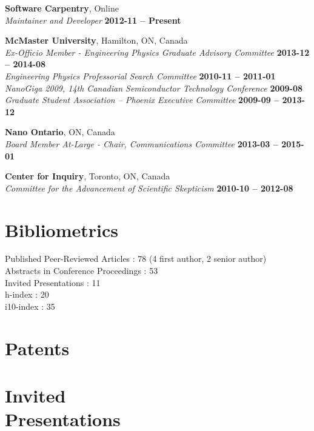 \documentclass[margin1,line,canadian]{resume}
\begin{document}
\begin{resume}
\textbf{Software Carpentry}, Online\\%
\textsl{Maintainer and Developer} \hfill \textbf{2012-11 -- Present}

\textbf{McMaster University}, Hamilton, ON, Canada\\%
\textsl{Ex-Officio Member - Engineering Physics Graduate Advisory Committee} \hfill \textbf{2013-12 -- 2014-08}\\
\textsl{Engineering Physics Professorial Search Committee} \hfill \textbf{2010-11 -- 2011-01}\\
\textsl{NanoGiga 2009, 14th Canadian Semiconductor Technology Conference} \hfill \textbf{2009-08}\\
\textsl{Graduate Student Association -- Phoenix Executive Committee} \hfill \textbf{2009-09 -- 2013-12}

\textbf{Nano Ontario}, ON, Canada\\%
\textsl{Board Member At-Large - Chair, Communications Committee} \hfill \textbf{2013-03 -- 2015-01}

\textbf{Center for Inquiry}, Toronto, ON, Canada\\%
\textsl{Committee for the Advancement of Scientific Skepticism} \hfill \textbf{2010-10 -- 2012-08}\\

\section{\mysidestyle Bibliometrics}
Published Peer-Reviewed Articles : 78 (4 first author, 2 senior author)\\
Abstracts in Conference Proceedings : 53\\
Invited Presentations : 11\\
h-index : 20\\
i10-index : 35\\

 \section{\mysidestyle Patents}
 \begin{refsection}
  \newrefcontext[sorting=ymdnt]
  \nocite{*}
  \printbibliography[heading=none]
 \end{refsection}
 \section{\mysidestyle Invited\\Presentations}
 \begin{refsection}
  \newrefcontext[sorting=ymdnt]
  \nocite{*}
  \printbibliography[heading=none]
 \end{refsection}

\end{resume}
\end{document}
